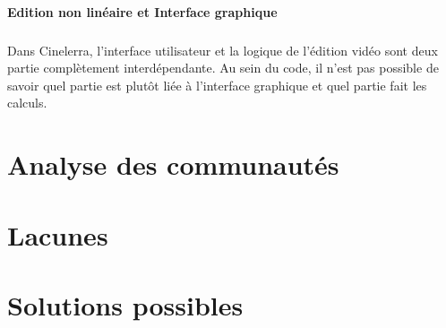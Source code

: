 \paragraph{Edition non linéaire et Interface graphique}

\subparagraph{}

Dans Cinelerra, l'interface utilisateur et la logique de l'édition vidéo
sont deux partie complètement interdépendante. Au sein du code, il n'est
pas possible de savoir quel partie est plutôt liée à l'interface
graphique et quel partie fait les calculs.


\newpage \section{Analyse des communautés}

\newpage \section{Lacunes}

\newpage \section{Solutions possibles}
